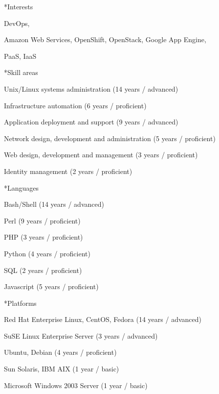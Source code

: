 \documentclass[10pt, a4paper, final]{article}
\begin{document}
\begin{minipage}[t]{0.32\linewidth}
\begin{section}
    \vspace{2em}
    \small
    \begin{subsection}*{Interests}
      \begin{inparadesc}
        \item DevOps,
        \item Amazon Web Services, OpenShift, OpenStack, Google App Engine,
        \item PaaS, IaaS
      \end{inparadesc}
    \end{subsection}
    \vspace{1em}
    \begin{subsection}*{Skill areas}
      \begin{compactitem}
        \item Unix/Linux systems administration (14 years / advanced) 
        \item Infrastructure automation (6 years / proficient) 
        \item Application deployment and support (9 years / advanced) 
        \item Network design, development and administration (5 years / proficient) 
        \item Web design, development and management (3 years / proficient) 
        \item Identity management (2 years / proficient) 
      \end{compactitem}
    \end{subsection}
    \vspace{1em}
    \begin{subsection}*{Languages}
      \begin{compactitem}
        \item Bash/Shell (14 years / advanced) 
        \item Perl (9 years / proficient) 
        \item PHP (3 years / proficient) 
        \item Python (4 years / proficient) 
        \item SQL (2 years / proficient) 
        \item Javascript (5 years / proficient) 
      \end{compactitem}
    \end{subsection}
    \vspace{1em}
    \begin{subsection}*{Platforms}
      \begin{compactitem}
        \item Red Hat Enterprise Linux, CentOS, Fedora (14 years / advanced) 
        \item SuSE Linux Enterprise Server (3 years / advanced) 
        \item Ubuntu, Debian (4 years / proficient) 
        \item Sun Solaris, IBM AIX (1 year / basic) 
        \item Microsoft Windows 2003 Server (1 year / basic) 
      \end{compactitem}
    \end{subsection}
  \end{section}
\end{minipage}
\end{document}
